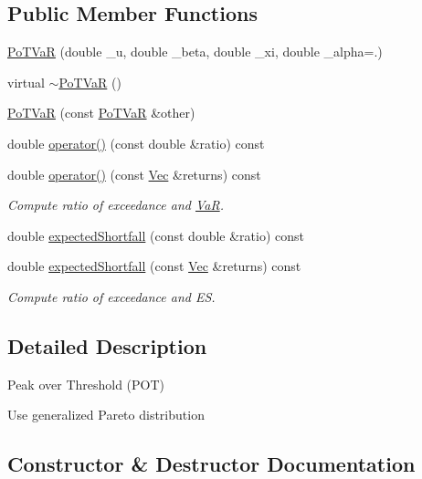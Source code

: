 \subsection*{Public Member Functions}
\begin{DoxyCompactItemize}
\item 
\hyperlink{classPoTVaR_a09f126a81fbd344ba9b095a1837bbb78}{Po\+T\+VaR} (double \+\_\+u, double \+\_\+beta, double \+\_\+xi, double \+\_\+alpha=.)
\item 
virtual \hyperlink{classPoTVaR_a1c80207f1679f5702f537ecea239d971}{$\sim$\+Po\+T\+VaR} ()
\item 
\hyperlink{classPoTVaR_a6a8b98090713854bd1e19fb20c2603c5}{Po\+T\+VaR} (const \hyperlink{classPoTVaR}{Po\+T\+VaR} \&other)
\item 
double \hyperlink{classPoTVaR_a7ee10c78ebe9cc0961e4344734860c97}{operator()} (const double \&ratio) const
\item 
double \hyperlink{classPoTVaR_a3360bbbeceae9bbd0c721e48586bf38c}{operator()} (const \hyperlink{compute__returns__eigen_8h_a1eb6a9306ef406d7975f3cbf2e247777}{Vec} \&returns) const
\begin{DoxyCompactList}\small\item\em Compute ratio of exceedance and \hyperlink{classVaR}{VaR}. \end{DoxyCompactList}\item 
double \hyperlink{classPoTVaR_a2a133206a1cec2c101cb68402c3c4041}{expected\+Shortfall} (const double \&ratio) const
\item 
double \hyperlink{classPoTVaR_ad89b58b1c90111b1af8568a16e8d6b96}{expected\+Shortfall} (const \hyperlink{compute__returns__eigen_8h_a1eb6a9306ef406d7975f3cbf2e247777}{Vec} \&returns) const
\begin{DoxyCompactList}\small\item\em Compute ratio of exceedance and ES. \end{DoxyCompactList}\end{DoxyCompactItemize}


\subsection{Detailed Description}
Peak over Threshold (P\+OT)

Use generalized Pareto distribution 

\subsection{Constructor \& Destructor Documentation}
\hypertarget{classPoTVaR_a09f126a81fbd344ba9b095a1837bbb78}{}\label{classPoTVaR_a09f126a81fbd344ba9b095a1837bbb78} 
